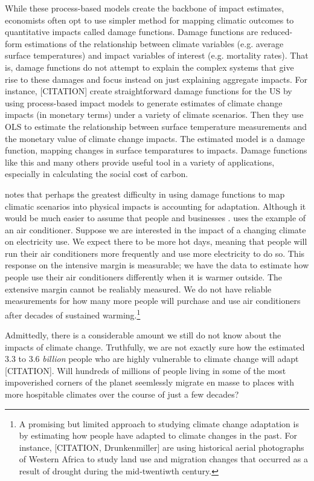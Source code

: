 While these process-based models create the backbone of impact estimates, economists often opt to use simpler method for mapping climatic outcomes to quantitative impacts called damage functions. Damage functions are reduced-form estimations of the relationship between climate variables (e.g. average surface temperatures) and impact variables of interest (e.g. mortality rates). That is, damage functions do not attempt to explain the complex systems that give rise to these damages and focus instead on just explaining aggregate impacts. For instance, [CITATION] create straightforward damage functions for the US by using process-based impact models to generate estimates of climate change impacts (in monetary terms) under a variety of climate scenarios. Then they use OLS to estimate the relationship between surface temperature measurements and the monetary value of climate change impacts. The estimated model is a damage function, mapping changes in surface temparatures to impacts. Damage functions like this and many others provide useful tool in a variety of applications, especially in calculating the social cost of carbon. 

\cite{auffhammer2018quantifying} notes that perhaps the greatest difficulty in using damage functions to map climatic scenarios into physical impacts is accounting for adaptation. Although it would be much easier to assume that people and businesses . \cite{auffhammer2018quantifying} uses the example of an air conditioner. Suppose we are interested in the impact of a changing climate on electricity use. We expect there to be more hot days, meaning that people will run their air conditioners more frequently and use more electricity to do so. This response on the intensive margin is measurable; we have the data to estimate how people use their air conditioners differently when it is warmer outside. The extensive margin cannot be realiably measured. 
We do not have reliable measurements for how many more people will purchase and use air conditioners after decades of sustained warming.\footnote{A promising but limited approach to studying climate change adaptation is by estimating how people have adapted to climate changes in the past. For instance, [CITATION, Drunkenmiller] are using historical aerial photographs of Western Africa to study land use and migration changes that occurred as a result of drought during the mid-twentiwth century.}

Admittedly, there is a considerable amount we still do not know about the impacts of climate change. Truthfully, we are not exactly sure how the estimated 3.3 to 3.6 \emph{billion} people who are highly vulnerable to climate change will adapt [CITATION]. Will hundreds of millions of people living in some of the most impoverished corners of the planet seemlessly migrate en masse to places with more hospitable climates over the course of just a few decades? 

